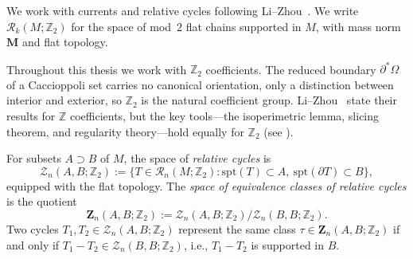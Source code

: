 We work with currents and relative cycles following Li--Zhou~\cite{LZ17}. We write $\mathcal{R}_k(M;\mathbb{Z}_2)$ for the space of mod~$2$ flat chains supported in $M$, with mass norm $\mathbf{M}$ and flat topology.

\begin{remark}\label{rmk:Z2}
Throughout this thesis we work with $\mathbb{Z}_2$ coefficients. The reduced boundary $\partial^*\Omega$ of a Caccioppoli set carries no canonical orientation, only a distinction between interior and exterior, so $\mathbb{Z}_2$ is the natural coefficient group. Li--Zhou~\cite{LZ17} state their results for $\mathbb{Z}$ coefficients, but the key tools---the isoperimetric lemma, slicing theorem, and regularity theory---hold equally for $\mathbb{Z}_2$ (see \cite{MN17,Alm62}).
\end{remark}

\begin{definition}\label{def:relative-cycle}
For subsets $A \supset B$ of $M$, the space of \emph{relative cycles} is
\[
\mathcal{Z}_n(A, B;\mathbb{Z}_2) := \{T \in \mathcal{R}_n(M;\mathbb{Z}_2) : \mathrm{spt}(T) \subset A, \ \mathrm{spt}(\partial T) \subset B\},
\]
equipped with the flat topology. The \emph{space of equivalence classes of relative cycles} is the quotient
\[
\mathbf{Z}_n(A, B;\mathbb{Z}_2) := \mathcal{Z}_n(A, B;\mathbb{Z}_2) / \mathcal{Z}_n(B, B;\mathbb{Z}_2).
\]
Two cycles $T_1, T_2 \in \mathcal{Z}_n(A, B;\mathbb{Z}_2)$ represent the same class $\tau \in \mathbf{Z}_n(A, B;\mathbb{Z}_2)$ if and only if $T_1 - T_2 \in \mathcal{Z}_n(B, B;\mathbb{Z}_2)$, i.e., $T_1 - T_2$ is supported in $B$.
\end{definition}

